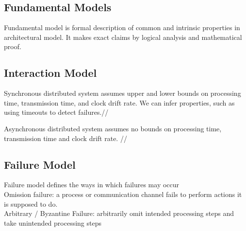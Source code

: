 \begin{multicols*}{2}
\section{Fundamental Models}

\noindent Fundamental model is formal description of common and intrinsic properties in architectural model. It makes exact claims by logical analysis and mathematical proof. 

\subsection{Interaction Model}

\noindent Synchronous distributed system assumes upper and lower bounds on processing time, transmission time, and clock drift rate. We can infer properties, such as using timeouts to detect failures.//

\noindent Asynchronous distributed system assumes no bounds on processing time, transmission time and clock drift rate. //

\subsection{Failure Model}

\noindent Failure model defines the ways in which failures may occur\\

\noindent Omission failure: a process or communication channel fails to perform actions it is supposed to do. \\

\noindent Arbitrary / Byzantine Failure: arbitrarily omit intended processing steps and take unintended processing steps\\

\end{multicols*}